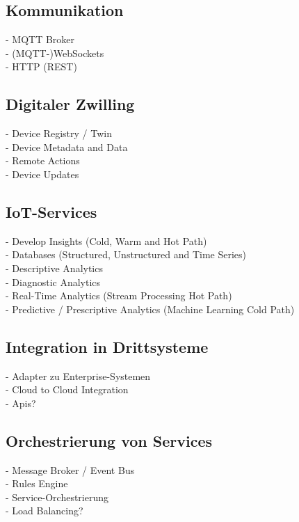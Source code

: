 \subsection{Kommunikation}\label{subsec:Kommunikation}
- MQTT Broker\\
- (MQTT-)WebSockets\\
- HTTP (REST)\\
\subsection{Digitaler Zwilling}\label{subsec:Digitaler Zwilling}
- Device Registry / Twin\\
- Device Metadata and Data\\
- Remote Actions\\
- Device Updates\\
\subsection{IoT-Services}\label{subsec:IoT-Services}
- Develop Insights (Cold, Warm and Hot Path)\\
- Databases (Structured, Unstructured and Time Series)\\
- Descriptive Analytics\\
- Diagnostic Analytics\\
- Real-Time Analytics (Stream Processing Hot Path)\\
- Predictive / Prescriptive Analytics (Machine Learning Cold Path)\\
\subsection{Integration in Drittsysteme}\label{subsec:Integration in Drittsysteme}
- Adapter zu Enterprise-Systemen\\
- Cloud to Cloud Integration\\
- Apis?\\
\subsection{Orchestrierung von Services}\label{subsec:Orchestrierung von Services}
- Message Broker / Event Bus\\
- Rules Engine\\
- Service-Orchestrierung\\
- Load Balancing?\\
